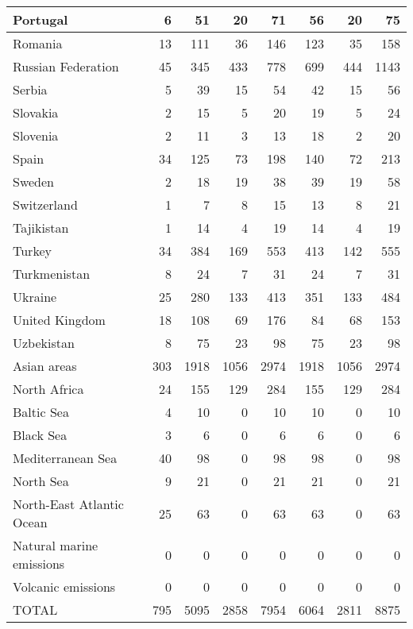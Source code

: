 \begin{table}
\begin{center}
\begin{tabular}{|l|r|r|r|r||r|r|r|}
                      Portugal&     6&    51&    20&    71&    56&    20&    75 \\\hline
                       Romania&    13&   111&    36&   146&   123&    35&   158 \\\hline
            Russian Federation&    45&   345&   433&   778&   699&   444&  1143 \\\hline
                        Serbia&     5&    39&    15&    54&    42&    15&    56 \\\hline
                      Slovakia&     2&    15&     5&    20&    19&     5&    24 \\\hline
                      Slovenia&     2&    11&     3&    13&    18&     2&    20 \\\hline
                         Spain&    34&   125&    73&   198&   140&    72&   213 \\\hline
                        Sweden&     2&    18&    19&    38&    39&    19&    58 \\\hline
                   Switzerland&     1&     7&     8&    15&    13&     8&    21 \\\hline
                    Tajikistan&     1&    14&     4&    19&    14&     4&    19 \\\hline
                        Turkey&    34&   384&   169&   553&   413&   142&   555 \\\hline
                  Turkmenistan&     8&    24&     7&    31&    24&     7&    31 \\\hline
                       Ukraine&    25&   280&   133&   413&   351&   133&   484 \\\hline
                United Kingdom&    18&   108&    69&   176&    84&    68&   153 \\\hline
                    Uzbekistan&     8&    75&    23&    98&    75&    23&    98 \\\hline
                   Asian areas&   303&  1918&  1056&  2974&  1918&  1056&  2974 \\\hline
                  North Africa&    24&   155&   129&   284&   155&   129&   284 \\\hline
                    Baltic Sea&     4&    10&     0&    10&    10&     0&    10 \\\hline
                     Black Sea&     3&     6&     0&     6&     6&     0&     6 \\\hline
             Mediterranean Sea&    40&    98&     0&    98&    98&     0&    98 \\\hline
                     North Sea&     9&    21&     0&    21&    21&     0&    21 \\\hline
     North-East Atlantic Ocean&    25&    63&     0&    63&    63&     0&    63 \\\hline
      Natural marine emissions&     0&     0&     0&     0&     0&     0&     0 \\\hline
            Volcanic emissions&     0&     0&     0&     0&     0&     0&     0 \\\hline\hline
                         TOTAL&   795&  5095&  2858&  7954&  6064&  2811&  8875 \\\hline


\end{tabular}
\end{center}
\end{table}
